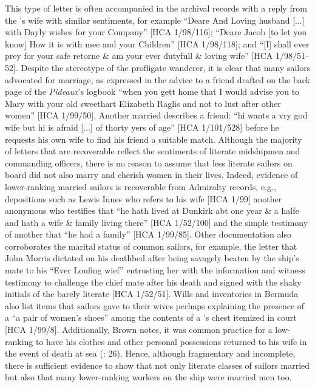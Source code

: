 This type of letter is often accompanied in the archival records with a reply from the ’s wife with similar sentiments, for example “Deare And Loving husband [...] with Dayly wishes for your Company” [HCA 1/98/116]; “Deare Jacob [to let you know] How it is with mee and your Children” [HCA 1/98/118]; and “[I] shall ever prey for your safe retorne \& am your ever dutyfull \& loving wife” [HCA 1/98/51–52]. Despite the stereotype of the profligate wanderer, it is clear that many sailors advocated for marriage, as expressed in the advice to a friend drafted on the back page of the \textit{Pideaux}’s logbook “when you gett home that I would advise you to Mary with your old sweethart Elizabeth Raglis and not to lust after other women” [HCA 1/99/50]. Another married  describes a friend: “hi wants a vry god wife but hi is afraid [...] of thorty yers of age” [HCA 1/101/528] before he requests his own wife to find his friend a suitable match. Although the majority of letters that are recoverable reflect the sentiments of literate midshipmen and commanding officers, there is no reason to assume that less literate sailors on board did not also marry and cherish women in their lives. Indeed, evidence of lower-ranking married sailors is recoverable from Admiralty records, e.g., depositions such as Lewis Innes who refers to his wife [HCA 1/99] another anonymous  who testifies that “he hath lived at Dunkirk abt one year \& a halfe and hath a wife \& family living there” [HCA 1/52/100] and the simple testimony of another that “he had a family” [HCA 1/99/85]. Other documentation also corroborates the marital status of common sailors, for example, the letter that John Morris dictated on his deathbed after being savagely beaten by the ship’s mate to his “Ever Loufing wief” entrusting her with the information and witness testimony to challenge the chief mate after his death and signed with the shaky initials of the barely literate [HCA 1/52/51]. Wills and inventories in Bermuda also list items that sailors gave to their wives \citep[214]{Jarvis2010} perhaps explaining the presence of a “a pair of women’s shoes” among the contents of a ’s chest itemized in court [HCA 1/99/8]. Additionally, Brown notes, it was common practice for a low-ranking  to have his clothes and other personal possessions returned to his wife in the event of death at sea (\citealt{Brown2011}: 26). Hence, although fragmentary and incomplete, there is sufficient evidence to show that not only literate classes of sailors married but also that many lower-ranking workers on the ship were married men too. 

